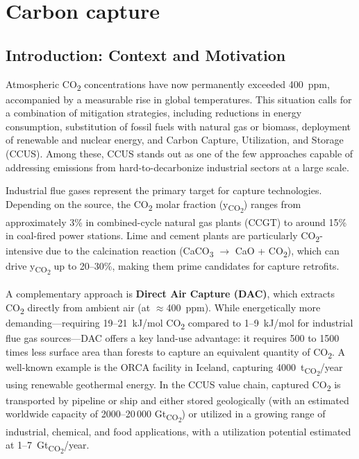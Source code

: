 \chapter{Carbon capture}

\section{Introduction: Context and Motivation}

Atmospheric CO\textsubscript{2} concentrations have now permanently exceeded 400~ppm, 
accompanied by a measurable rise in global temperatures. This situation calls for a 
combination of mitigation strategies, including reductions in energy consumption, 
substitution of fossil fuels with natural gas or biomass, deployment of renewable and 
nuclear energy, and Carbon Capture, Utilization, and Storage (CCUS). Among these, CCUS 
stands out as one of the few approaches capable of addressing emissions from 
hard-to-decarbonize industrial sectors at a large scale.

Industrial flue gases represent the primary target for capture technologies. Depending 
on the source, the CO\textsubscript{2} molar fraction (y\textsubscript{CO\textsubscript{2}}) 
ranges from approximately 3\% in combined-cycle natural gas plants (CCGT) to around 
15\% in coal-fired power stations. Lime and cement plants are particularly CO\textsubscript{2}-intensive 
due to the calcination reaction (CaCO\textsubscript{3} $\rightarrow$ CaO + CO\textsubscript{2}), 
which can drive y\textsubscript{CO\textsubscript{2}} up to 20--30\%, making them prime 
candidates for capture retrofits.

A complementary approach is \textbf{Direct Air Capture (DAC)}, which extracts 
CO\textsubscript{2} directly from ambient air (at $\approx$400~ppm). While energetically 
more demanding---requiring 19--21~kJ/mol CO\textsubscript{2} compared to 1--9~kJ/mol 
for industrial flue gas sources---DAC offers a key land-use advantage: it requires 
500 to 1500 times less surface area than forests to capture an equivalent quantity of 
CO\textsubscript{2}. A well-known example is the ORCA facility in Iceland, capturing 
4000~t\textsubscript{CO\textsubscript{2}}/year using renewable geothermal energy. In 
the CCUS value chain, captured CO\textsubscript{2} is transported by pipeline or ship 
and either stored geologically (with an estimated worldwide capacity of 2000--20\,000 
Gt\textsubscript{CO\textsubscript{2}}) or utilized in a growing range of industrial, 
chemical, and food applications, with a utilization potential estimated at 
1--7~Gt\textsubscript{CO\textsubscript{2}}/year.

